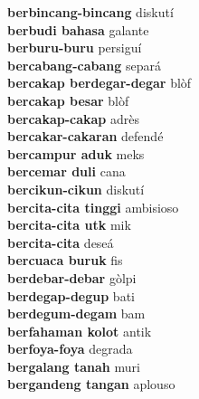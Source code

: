 \textbf{ berbincang-bincang  } diskutí \\
\textbf{ berbudi bahasa  } galante \\
\textbf{ berburu-buru  } persiguí \\
\textbf{ bercabang-cabang  } separá \\
\textbf{ bercakap berdegar-degar  } blòf \\
\textbf{ bercakap besar  } blòf \\
\textbf{ bercakap-cakap  } adrès \\
\textbf{ bercakar-cakaran  } defendé \\
\textbf{ bercampur aduk  } meks \\
\textbf{ bercemar duli  } cana \\
\textbf{ bercikun-cikun  } diskutí \\
\textbf{ bercita-cita tinggi  } ambisioso \\
\textbf{ bercita-cita utk  } mik \\
\textbf{ bercita-cita  } deseá \\
\textbf{ bercuaca buruk  } fis \\
\textbf{ berdebar-debar  } gòlpi \\
\textbf{ berdegap-degup  } bati \\
\textbf{ berdegum-degam  } bam \\
\textbf{ berfahaman kolot  } antik \\
\textbf{ berfoya-foya  } degrada \\
\textbf{ bergalang tanah  } muri \\
\textbf{ bergandeng tangan  } aplouso \\
